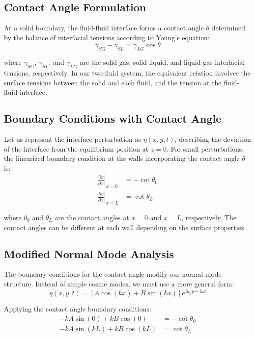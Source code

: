 \documentclass[12pt,a4paper]{article}
\begin{document}
\subsection{Contact Angle Formulation}
At a solid boundary, the fluid-fluid interface forms a contact angle $\theta$ determined by the balance of interfacial tensions according to Young's equation:
\begin{equation}
\gamma_{SG} - \gamma_{SL} = \gamma_{LG}\cos\theta
\end{equation}

where $\gamma_{SG}$, $\gamma_{SL}$, and $\gamma_{LG}$ are the solid-gas, solid-liquid, and liquid-gas interfacial tensions, respectively. In our two-fluid system, the equivalent relation involves the surface tensions between the solid and each fluid, and the tension at the fluid-fluid interface.

\subsection{Boundary Conditions with Contact Angle}

Let us represent the interface perturbation as $\eta(x,y,t)$, describing the deviation of the interface from the equilibrium position at $z = 0$. For small perturbations, the linearized boundary condition at the walls incorporating the contact angle $\theta$ is:
\begin{align}
\left.\frac{\partial \eta}{\partial x}\right|_{x=0} &= -\cot\theta_0 \\
\left.\frac{\partial \eta}{\partial x}\right|_{x=L} &= \cot\theta_L
\end{align}

where $\theta_0$ and $\theta_L$ are the contact angles at $x = 0$ and $x = L$, respectively. The contact angles can be different at each wall depending on the surface properties.

\subsection{Modified Normal Mode Analysis}
The boundary conditions for the contact angle modify our normal mode structure. Instead of simple cosine modes, we must use a more general form:
\begin{equation}
\eta(x,y,t) = [A\cos(kx) + B\sin(kx)]e^{ik_y y - i\omega t}
\end{equation}

Applying the contact angle boundary conditions:
\begin{align}
-kA\sin(0) + kB\cos(0) &= -\cot\theta_0 \\
-kA\sin(kL) + kB\cos(kL) &= \cot\theta_L
\end{align}
\end{document}
